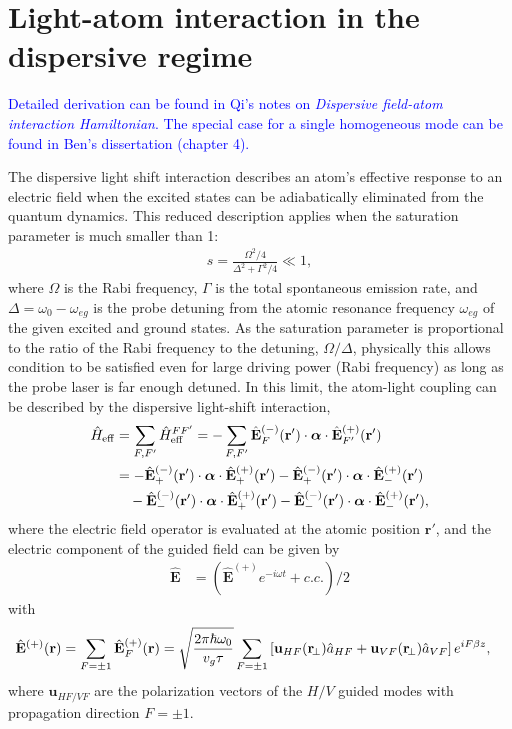 \documentclass[preprint,aps,pra,onecolumn]{revtex4-1} %
\renewcommand{\tensor}[1]{\boldsymbol{#1}}
\begin{document}

\section{Light-atom interaction in the dispersive regime}
\textcolor{blue}{Detailed derivation can be found in Qi's notes on \textit{Dispersive field-atom interaction Hamiltonian}. The special case for a single homogeneous mode can be found in Ben's dissertation (chapter 4). }


The dispersive light shift interaction describes an atom's effective response to an electric field when the excited states can be adiabatically eliminated from the quantum dynamics.  This reduced description applies when the saturation parameter is much smaller than 1:
	\begin{align} \label{Eq::SatParameter}
		s = \frac{ \Omega^2/4}{\Delta^2 + \Gamma^2/4} \ll 1,  
	\end{align}
where $\Omega$ is the Rabi frequency, $\Gamma$ is the total spontaneous emission rate, and $\Delta = \omega_0 - \omega_{eg}$ is the probe detuning from the atomic resonance frequency $\omega_{eg}$ of the given excited and ground states. As the saturation parameter is proportional to the ratio of the Rabi frequency to the detuning, $\Omega/\Delta$, physically this allows condition  to be satisfied even for large driving power (Rabi frequency) as long as the probe laser is far enough detuned.  In this limit, the atom-light coupling can be described by the dispersive light-shift interaction,
\begin{align} 
	\hat{H}_{\rm eff} & = \sum_{F,F'}\hat{H}_{\rm eff}^{FF'} =- \sum_{F,F'}\hat{\mathbf{E}}^{(-)}_F(\mathbf{r}' ) \cdot \tensor{\alpha} \cdot \hat{\mathbf{E}}^{(+)}_{F'}(\mathbf{r}' )\\
	&= - \hat{\mathbf{E}}^{(-)}_+(\mathbf{r}' ) \cdot \tensor{\alpha} \cdot \hat{\mathbf{E}}^{(+)}_+(\mathbf{r}' )
	- \hat{\mathbf{E}}^{(-)}_+(\mathbf{r}' ) \cdot \tensor{\alpha} \cdot \hat{\mathbf{E}}^{(+)}_-(\mathbf{r}' )\nonumber\\
	&\quad - \hat{\mathbf{E}}^{(-)}_-(\mathbf{r}' ) \cdot \tensor{\alpha} \cdot \hat{\mathbf{E}}^{(+)}_+(\mathbf{r}' )
	- \hat{\mathbf{E}}^{(-)}_-(\mathbf{r}' ) \cdot \tensor{\alpha} \cdot \hat{\mathbf{E}}^{(+)}_-(\mathbf{r}' ), \label{Eq::LightShiftHam}
\end{align}
where the electric field operator is evaluated at the atomic position $\mathbf{r}'$, and the electric component of the guided field can be given by
\begin{align}
\hat{\mathbf{E}} &= (\hat{\mathbf{E}}^{(+)}e^{-i\omega t}+c.c.)/2
\end{align}   
with
\begin{align}
\hat{\mathbf{E}}^{(+)}(\mathbf{r}) &= \sum_{F=\pm 1} \hat{\mathbf{E}}^{(+)}_F(\mathbf{r}) = \sqrt{\frac{2\pi \hbar \omega_0}{v_g\tau}}\sum_{F=\pm 1} \left[ \mathbf{u}_{HF}(\mathbf{r}\!_\perp)\hat{a}_{HF} + \mathbf{u}_{VF}(\mathbf{r}\!_\perp)\hat{a}_{VF} \right]e^{iF\beta z},
\end{align}
where $\mathbf{u}_{HF/VF}$ are the polarization vectors of the $H/V$ guided modes with propagation direction $F=\pm 1$. 
\end{document}

